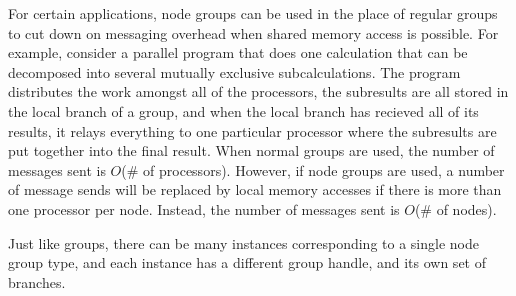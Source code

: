 For certain applications, node groups can be used in the place of
regular groups to cut down on messaging overhead when shared memory
access is possible.  For example, consider a parallel program that
does one calculation that can be decomposed into several mutually
exclusive subcalculations.  The program distributes the work amongst
all of the processors, the subresults are all stored in the local
branch of a group, and when the local branch has recieved all of its
results, it relays everything to one particular processor where the
subresults are put together into the final result.  When normal groups
are used, the number of messages sent is $O$(\# of processors).
However, if node groups are used, a number of message sends will be
replaced by local memory accesses if there is more than
one processor per node.  Instead, the number of messages sent is
$O$(\# of nodes).

Just like groups, there can be many instances corresponding to a single node
group type, and each instance has a different group handle, and its own set of
branches.


